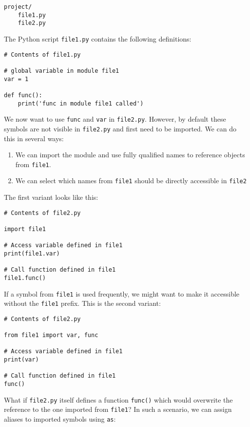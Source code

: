 \documentclass[10pt]{scrartcl}
\providecommand{\tightlist}{%
      \setlength{\itemsep}{0pt}\setlength{\parskip}{0pt}}
\begin{document}
\begin{verbatim}
project/
    file1.py
    file2.py
\end{verbatim}

The Python script \texttt{file1.py} contains the following definitions:

\begin{verbatim}
# Contents of file1.py

# global variable in module file1
var = 1

def func():
    print('func in module file1 called')
\end{verbatim}

We now want to use \texttt{func} and \texttt{var} in \texttt{file2.py}.
However, by default these symbols are not visible in \texttt{file2.py}
and first need to be imported. We can do this in several ways:

\begin{enumerate}
\def\labelenumi{\arabic{enumi}.}
\tightlist
\item
  We can import the module and use fully qualified names to reference
  objects from \texttt{file1}.
\item
  We can select which names from \texttt{file1} should be directly
  accessible in \texttt{file2}
\end{enumerate}

The first variant looks like this:

\begin{verbatim}
# Contents of file2.py

import file1

# Access variable defined in file1
print(file1.var)

# Call function defined in file1
file1.func()
\end{verbatim}

If a symbol from \texttt{file1} is used frequently, we might want to
make it accessible without the \texttt{file1} prefix. This is the second
variant:

\begin{verbatim}
# Contents of file2.py

from file1 import var, func

# Access variable defined in file1
print(var)

# Call function defined in file1
func()
\end{verbatim}

What if \texttt{file2.py} itself defines a function \texttt{func()}
which would overwrite the reference to the one imported from
\texttt{file1}? In such a scenario, we can assign aliases to imported
symbols using \texttt{as}:
\end{document}
